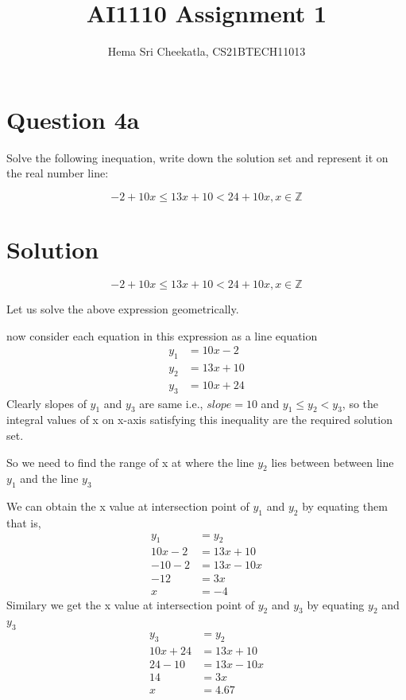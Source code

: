 \documentclass[16pt, a4paper, two column]{article}
\title{AI1110 Assignment 1}
\author{Hema Sri Cheekatla, CS21BTECH11013}
\begin{document}
\maketitle
\section*{Question 4a}
Solve the following inequation, write down the solution set and represent it on the real number line:

\[  -2 + 10x \leq 13x + 10 < 24 + 10x,  x\in \mathbb{Z} \]

\section*{Solution}
\[  -2 + 10x \leq 13x + 10 < 24 + 10x,  x\in \mathbb{Z} \]

\noindent Let us solve the above expression geometrically.

now consider each equation in this expression as a line equation
\begin{align*}
y_1 &= 10x - 2 \\
y_2 &= 13x + 10 \\
y_3 &= 10x + 24
\end{align*}
Clearly slopes of $y_1$ and $y_3$ are same i.e., $slope = 10$\newline
and $y_1 \leq y_2 < y_3 $, so the integral values of x on x-axis satisfying this inequality are the required solution set.

So we need to find the range of x at where the line $y_2$ lies between between line $y_1$ and the line $y_3$

We can obtain the x value at intersection point of $y_1$ and $y_2$ by equating them that is,
\begin{align*}
	y_1 &= y_2 \\
	10x - 2 &= 13x + 10 \\
	-10 -2 &= 13x - 10x \\
	-12 &= 3x \\
	x &= -4
\end{align*}
Similary we get the x value at intersection point of $y_2$ and $y_3$ by equating $y_2$ and $y_3$
\begin{align*}
	y_3 &= y_2 \\
	10x + 24 &= 13x + 10 \\
	24 - 10 &= 13x - 10x \\
	14 &= 3x \\
	x &= 4.67 
\end{align*}
\end{document}
